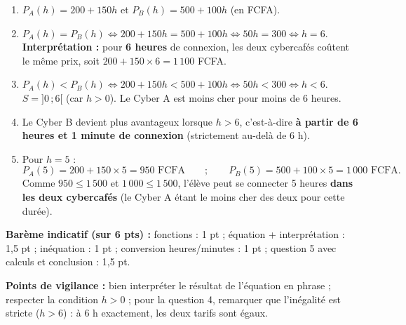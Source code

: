 \documentclass[11pt]{article}
\begin{document}
\begin{corrige}
\begin{enumerate}
    \item $P_A(h) = 200 + 150h$ \quad et \quad $P_B(h) = 500 + 100h$ (en FCFA).
    \item $P_A(h) = P_B(h) \iff 200 + 150h = 500 + 100h \iff 50h = 300 \iff h = 6$.\\
    \textbf{Interprétation :} pour \textbf{6 heures} de connexion, les deux cybercafés coûtent le même prix, soit $200 + 150 \times 6 = 1\,100$ FCFA.
    \item $P_A(h) < P_B(h) \iff 200 + 150h < 500 + 100h \iff 50h < 300 \iff h < 6$.\\
    $S = ]0\,; 6[$ (car $h > 0$). Le Cyber A est moins cher pour moins de 6 heures.
    \item Le Cyber B devient plus avantageux lorsque $h > 6$, c'est-à-dire \textbf{à partir de 6 heures et 1 minute de connexion} (strictement au-delà de 6 h).
    \item Pour $h = 5$ :
    \[ P_A(5) = 200 + 150 \times 5 = 950 \text{ FCFA} \qquad ; \qquad P_B(5) = 500 + 100 \times 5 = 1\,000 \text{ FCFA}. \]
    Comme $950 \leqslant 1\,500$ et $1\,000 \leqslant 1\,500$, l'élève peut se connecter 5 heures \textbf{dans les deux cybercafés} (le Cyber A étant le moins cher des deux pour cette durée).
\end{enumerate}

\textbf{Barème indicatif (sur 6 pts) :} fonctions : 1 pt ; équation + interprétation : 1,5 pt ; inéquation : 1 pt ; conversion heures/minutes : 1 pt ; question 5 avec calculs et conclusion : 1,5 pt.

\textbf{Points de vigilance :} bien interpréter le résultat de l'équation en phrase ; respecter la condition $h > 0$ ; pour la question 4, remarquer que l'inégalité est stricte ($h > 6$) : à 6 h exactement, les deux tarifs sont égaux.
\end{corrige}
\end{document}
